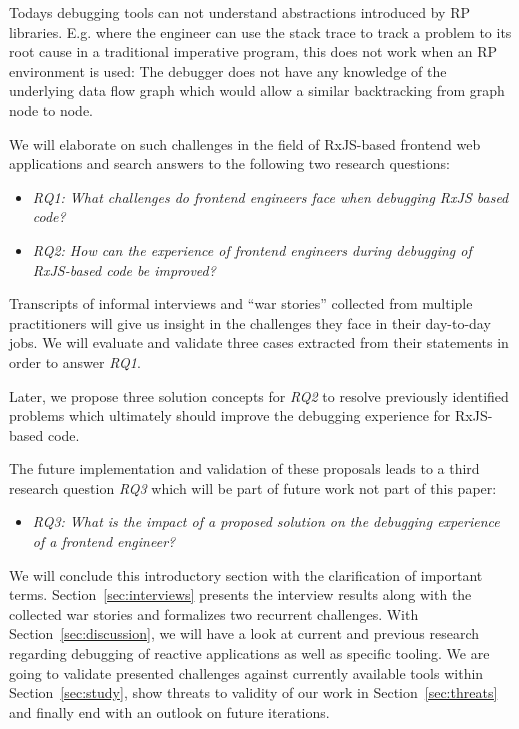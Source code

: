 \documentclass[12pt,a4paper]{article}
\begin{document}
Todays debugging tools can not understand abstractions introduced by RP libraries. E.g. where the engineer can use the stack trace to track a problem to its root cause in a traditional imperative program, this does not work when an RP environment is used: The debugger does not have any knowledge of the underlying data flow graph which would allow a similar backtracking from graph node to node.

We will elaborate on such challenges in the field of RxJS-based frontend web applications and search answers to the following two research questions:

\begin{itemize}
	\item \emph{RQ1: What challenges do frontend engineers face when debugging RxJS based code?}
	\item \emph{RQ2: How can the experience of frontend engineers during debugging of RxJS-based code be improved?}
\end{itemize}

Transcripts of informal interviews and ``war stories'' collected from multiple practitioners will give us insight in the challenges they face in their day-to-day jobs. We will evaluate and validate three cases extracted from their statements in order to answer \emph{RQ1}.

Later, we propose three solution concepts for \emph{RQ2} to resolve previously identified problems which ultimately should improve the debugging experience for RxJS-based code.

The future implementation and validation of these proposals leads to a third research question \emph{RQ3} which will be part of future work not part of this paper:

\begin{itemize}
	\item \emph{RQ3: What is the impact of a proposed solution on the debugging experience of a frontend engineer?}
\end{itemize}

We will conclude this introductory section with the clarification of important terms. Section~\ref{sec:interviews} presents the interview results along with the collected war stories and formalizes two recurrent challenges. With Section~\ref{sec:discussion}, we will have a look at current and previous research regarding debugging of reactive applications as well as specific tooling. We are going to validate presented challenges against currently available tools within Section~\ref{sec:study}, show threats to validity of our work in Section~\ref{sec:threats} and finally end with an outlook on future iterations.
\end{document}

